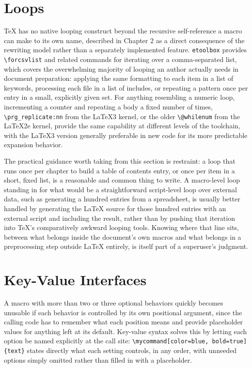 \hypertarget{loops}{%
\section{Loops}\label{loops}}

TeX has no native looping construct beyond the recursive self-reference a macro can make to its own name, described in Chapter 2 as a direct consequence of the rewriting model rather than a separately implemented feature. \texttt{etoolbox} provides \texttt{\textbackslash{}forcsvlist} and related commands for iterating over a comma-separated list, which covers the overwhelming majority of looping an author actually needs in document preparation: applying the same formatting to each item in a list of keywords, processing each file in a list of includes, or repeating a pattern once per entry in a small, explicitly given set. For anything resembling a numeric loop, incrementing a counter and repeating a body a fixed number of times, \texttt{\textbackslash{}prg\_replicate:nn} from the LaTeX3 kernel, or the older \texttt{\textbackslash{}@whilenum} from the LaTeX2e kernel, provide the same capability at different levels of the toolchain, with the LaTeX3 version generally preferable in new code for its more predictable expansion behavior.

The practical guidance worth taking from this section is restraint: a loop that runs once per chapter to build a table of contents entry, or once per item in a short, fixed list, is a reasonable and common thing to write. A macro-level loop standing in for what would be a straightforward script-level loop over external data, such as generating a hundred entries from a spreadsheet, is usually better handled by generating the LaTeX source for those hundred entries with an external script and including the result, rather than by pushing that iteration into TeX's comparatively awkward looping tools. Knowing where that line sits, between what belongs inside the document's own macros and what belongs in a preprocessing step outside LaTeX entirely, is itself part of a superuser's judgment.

\hypertarget{key-value-interfaces}{%
\section{Key-Value Interfaces}\label{key-value-interfaces}}

A macro with more than two or three optional behaviors quickly becomes unusable if each behavior is controlled by its own positional argument, since the calling code has to remember what each position means and provide placeholder values for anything left at its default. Key-value syntax solves this by letting each option be named explicitly at the call site: \texttt{\textbackslash{}mycommand{[}color=blue,\ bold=true{]}\{text\}} states directly what each setting controls, in any order, with unneeded options simply omitted rather than filled in with a placeholder.


